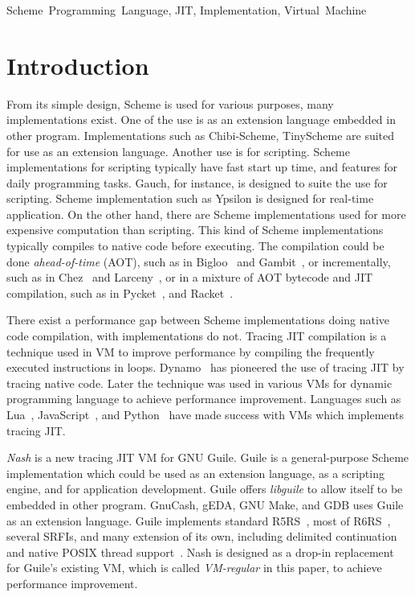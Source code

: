 \documentclass[preprint]{sigplanconf}
\begin{document}


\keywords
Scheme~Programming~Language, JIT, Implementation, Virtual~Machine

\section{Introduction}

From its simple design, Scheme is used for various purposes, many
implementations exist. One of the use is as an extension language embedded in
other program. Implementations such as Chibi-Scheme, TinyScheme are suited for
use as an extension language. Another use is for scripting. Scheme
implementations for scripting typically have fast start up time, and features
for daily programming tasks. Gauch, for instance, is designed to suite the use
for scripting. Scheme implementation such as Ypsilon is designed for real-time
application. On the other hand, there are Scheme implementations used for more
expensive computation than scripting. This kind of Scheme implementations
typically compiles to native code before executing. The compilation could be
done \textit{ahead-of-time} (AOT), such as in Bigloo~\cite{serrano1995bigloo}
and Gambit~\cite{feeley1998gambit}, or incrementally, such as in
Chez~\cite{dybvig2006development} and Larceny~\cite{hansen1992impact}, or in a
mixture of AOT bytecode and JIT compilation, such as in
Pycket~\cite{bauman2015pycket}, and Racket~\cite{flatt2013racket}.

There exist a performance gap between Scheme implementations doing native code
compilation, with implementations do not. Tracing JIT compilation is a
technique used in VM to improve performance by compiling the frequently
executed instructions in loops. Dynamo~\cite{bala2000dynamo} has pioneered the
use of tracing JIT by tracing native code. Later the technique was used in
various VMs for dynamic programming language to achieve performance
improvement. Languages such as Lua~\cite{pall2016luajit},
JavaScript~\cite{gal2009trace}, and Python~\cite{bolz2009tracing} have made
success with VMs which implements tracing JIT.\@

\textit{Nash} is a new tracing JIT VM for GNU Guile. Guile is a
general-purpose Scheme implementation which could be used as an extension
language, as a scripting engine, and for application development. Guile offers
\textit{libguile} to allow itself to be embedded in other program. GnuCash,
gEDA, GNU Make, and GDB uses Guile as an extension language. Guile implements
standard R5RS~\cite{abelson1998revised5}, most of
R6RS~\cite{sperber2010revised}, several SRFIs, and many extension of its own,
including delimited continuation and native POSIX thread
support~\cite{Galassi02guilereference}. Nash is designed as a drop-in
replacement for Guile's existing VM, which is called \textit{VM-regular} in
this paper, to achieve performance improvement.
\end{document}
